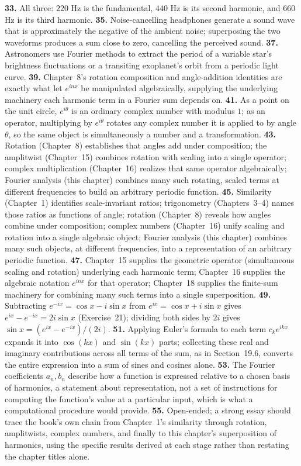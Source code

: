 \textbf{33.} All three: $220$ Hz is the fundamental, $440$ Hz is its
second harmonic, and $660$ Hz is its third harmonic. \quad
\textbf{35.} Noise-cancelling headphones generate a sound wave that is
approximately the negative of the ambient noise; superposing the two
waveforms produces a sum close to zero, cancelling the perceived sound.
\quad
\textbf{37.} Astronomers use Fourier methods to extract the period of a
variable star's brightness fluctuations or a transiting exoplanet's
orbit from a periodic light curve. \quad
\textbf{39.} Chapter~8's rotation composition and angle-addition
identities are exactly what let $e^{inx}$ be manipulated algebraically,
supplying the underlying machinery each harmonic term in a Fourier sum
depends on. \quad
\textbf{41.} As a point on the unit circle, $e^{i\theta}$ is an ordinary
complex number with modulus $1$; as an operator, multiplying by
$e^{i\theta}$ rotates any complex number it is applied to by angle
$\theta$, so the same object is simultaneously a number and a
transformation. \quad
\textbf{43.} Rotation (Chapter~8) establishes that angles add under
composition; the amplitwist (Chapter~15) combines rotation with scaling
into a single operator; complex multiplication (Chapter~16) realizes
that same operator algebraically; Fourier analysis (this chapter)
combines many such rotating, scaled terms at different frequencies to
build an arbitrary periodic function. \quad
\textbf{45.} Similarity (Chapter~1) identifies scale-invariant ratios;
trigonometry (Chapters~3--4) names those ratios as functions of angle;
rotation (Chapter~8) reveals how angles combine under composition;
complex numbers (Chapter~16) unify scaling and rotation into a single
algebraic object; Fourier analysis (this chapter) combines many such
objects, at different frequencies, into a representation of an
arbitrary periodic function. \quad
\textbf{47.} Chapter~15 supplies the geometric operator (simultaneous
scaling and rotation) underlying each harmonic term; Chapter~16 supplies
the algebraic notation $e^{inx}$ for that operator; Chapter~18 supplies
the finite-sum machinery for combining many such terms into a single
superposition. \quad
\textbf{49.} Subtracting $e^{-ix}=\cos x-i\sin x$ from $e^{ix}=\cos
x+i\sin x$ gives $e^{ix}-e^{-ix}=2i\sin x$ (Exercise~21); dividing both
sides by $2i$ gives $\sin x = (e^{ix}-e^{-ix})/(2i)$. \quad
\textbf{51.} Applying Euler's formula to each term $c_ke^{ikx}$ expands
it into $\cos(kx)$ and $\sin(kx)$ parts; collecting these real and
imaginary contributions across all terms of the sum, as in
Section~19.6, converts the entire expression into a sum of sines and
cosines alone. \quad
\textbf{53.} The Fourier coefficients $a_n,b_n$ describe how a function
is expressed relative to a chosen basis of harmonics, a statement about
representation, not a set of instructions for computing the function's
value at a particular input, which is what a computational procedure
would provide. \quad
\textbf{55.} Open-ended; a strong essay should trace the book's own
chain from Chapter~1's similarity through rotation, amplitwists, complex
numbers, and finally to this chapter's superposition of harmonics, using
the specific results derived at each stage rather than restating the
chapter titles alone.


